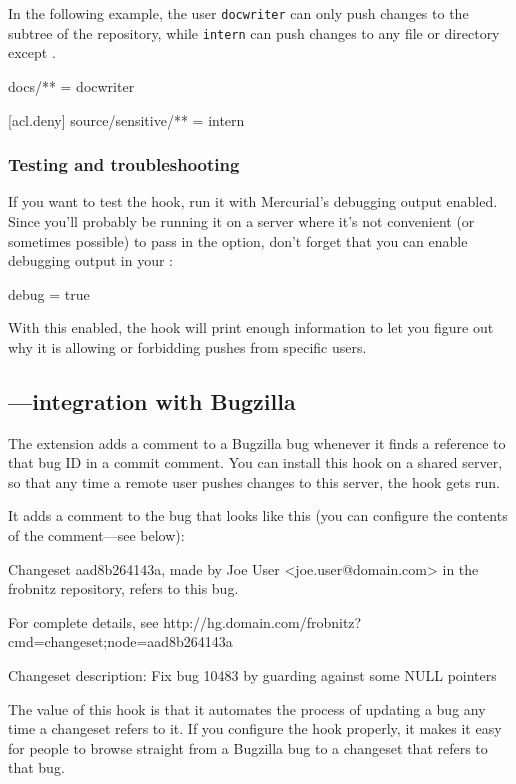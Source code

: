 In the following example, the user \texttt{docwriter} can only push
changes to the  subtree of the repository, while
\texttt{intern} can push changes to any file or directory except
.
\begin{codesample2}
  docs/** = docwriter

  [acl.deny]
  source/sensitive/** = intern
\end{codesample2}

\subsubsection{Testing and troubleshooting}

If you want to test the  hook, run it with Mercurial's
debugging output enabled.  Since you'll probably be running it on a
server where it's not convenient (or sometimes possible) to pass in
the  option, don't forget that you can enable
debugging output in your \hgrc:
\begin{codesample2}
  [ui]
  debug = true
\end{codesample2}
With this enabled, the  hook will print enough information
to let you figure out why it is allowing or forbidding pushes from
specific users.

\subsection{---integration with Bugzilla}

The  extension adds a comment to a Bugzilla bug
whenever it finds a reference to that bug ID in a commit comment.  You
can install this hook on a shared server, so that any time a remote
user pushes changes to this server, the hook gets run.  

It adds a comment to the bug that looks like this (you can configure
the contents of the comment---see below):
\begin{codesample2}
  Changeset aad8b264143a, made by Joe User <joe.user@domain.com> in
  the frobnitz repository, refers to this bug.

  For complete details, see
  http://hg.domain.com/frobnitz?cmd=changeset;node=aad8b264143a

  Changeset description:
        Fix bug 10483 by guarding against some NULL pointers
\end{codesample2}
The value of this hook is that it automates the process of updating a
bug any time a changeset refers to it.  If you configure the hook
properly, it makes it easy for people to browse straight from a
Bugzilla bug to a changeset that refers to that bug.

